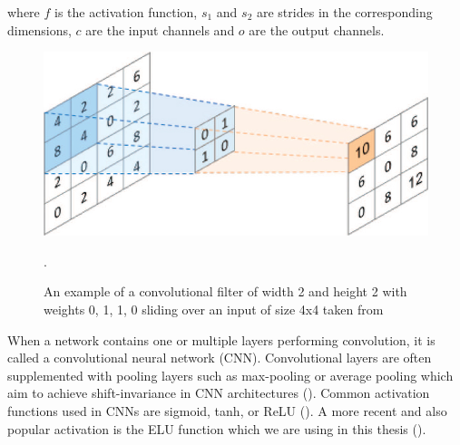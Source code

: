 where $f$ is the activation function, $s_1$ and $s_2$ are strides in the corresponding dimensions, $c$ are the input channels and $o$ are the output channels.

\begin{figure}[!htpb]
\centering
   \includegraphics[width=0.8\linewidth]{img/ch2/convolution}
   \caption[Convolutional filter]{An example of a convolutional filter of width 2 and height 2 with weights 0, 1, 1, 0 sliding over an input of size 4x4 taken from~\cite{conv-diagram}}.
\label{fig:convolution}
\end{figure}

When a network contains one or multiple layers performing convolution, it is called a convolutional neural network (CNN).
Convolutional layers are often supplemented with pooling layers such as max-pooling or average pooling which aim to achieve shift-invariance in CNN architectures (\cite{cnn-description}). 
Common activation functions used in CNNs are sigmoid, tanh, or ReLU (\cite{relu-paper}).
A more recent and also popular activation is the ELU function which we are using in this thesis (\cite{clevert-elu-2016}). 


